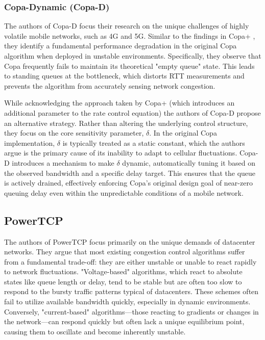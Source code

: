 \subsubsection{Copa-Dynamic (Copa-D)}

The authors of Copa-D focus their research on the unique challenges of highly volatile mobile networks, such as 4G and 5G\cite{COPADYNAMIC}. 
Similar to the findings in Copa+ \cite{COPAPLUS}, they identify a fundamental performance degradation in the original Copa algorithm when deployed in unstable environments\cite{COPADYNAMIC}. 
Specifically, they observe that Copa frequently fails to maintain its theoretical "empty queue" state\cite{COPADYNAMIC}. 
This leads to standing queues at the bottleneck, which distorts RTT measurements and prevents the algorithm from accurately sensing network congestion\cite{COPADYNAMIC}.

While acknowledging the approach taken by Copa+ (which introduces an additional parameter to the rate control equation) the authors of Copa-D propose an alternative strategy\cite{COPADYNAMIC}. 
Rather than altering the underlying control structure, they focus on the core sensitivity parameter, $\delta$\cite{COPADYNAMIC}.
In the original Copa implementation, $\delta$ is typically treated as a static constant, which the authors argue is the primary cause of its inability to adapt to cellular fluctuations\cite{COPADYNAMIC}. 
Copa-D introduces a mechanism to make $\delta$ dynamic, automatically tuning it based on the observed bandwidth and a specific delay target\cite{COPADYNAMIC}. 
This ensures that the queue is actively drained, effectively enforcing Copa’s original design goal of near-zero queuing delay even within the unpredictable conditions of a mobile network\cite{COPADYNAMIC}.

\subsection{PowerTCP}

The authors of PowerTCP focus primarily on the unique demands of datacenter networks\cite{PowerTCP}. 
They argue that most existing congestion control algorithms suffer from a fundamental trade-off: 
they are either unstable or unable to react rapidly to network fluctuations\cite{PowerTCP}. 
"Voltage-based" algorithms, which react to absolute states like queue length or delay, tend to be stable but are often too slow to respond to the bursty traffic patterns typical of datacenters\cite{PowerTCP}. 
These schemes often fail to utilize available bandwidth quickly, especially in dynamic environments\cite{PowerTCP}. 
Conversely, "current-based" algorithms—those reacting to gradients or changes in the network—can respond quickly but often lack a unique equilibrium point, causing them to oscillate and become inherently unstable\cite{PowerTCP}.

